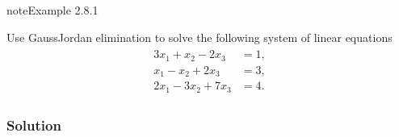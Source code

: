 \documentclass[letterpaper,10pt,english]{jupyterBook}
\begin{document}
\label{_pages/2.5_Gauss_Jordan_elimination:gje-example}
\begin{sphinxadmonition}{note}{Example 2.8.1}



\sphinxAtStartPar
Use Gauss\sphinxhyphen{}Jordan elimination to solve the following system of linear equations
\begin{equation*}
\begin{split} \begin{align*}
    3x_1 + x_2 - 2 x_3 &= 1, \\
    x_1 - x_2 + 2x_3 &= 3, \\
    2x_1 - 3x_2 + 7x_3 &= 4.
\end{align*} \end{split}
\end{equation*}\subsubsection*{Solution}


\end{sphinxadmonition}
\end{document}
